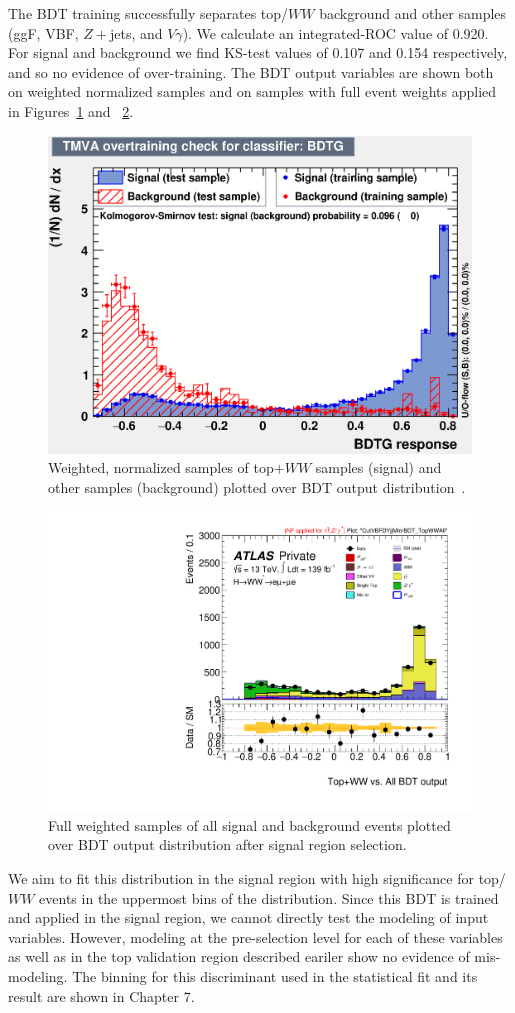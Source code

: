 The BDT training successfully separates top/$WW$ background and other samples (ggF, VBF, $Z+$jets, and $V\gamma$). We calculate an integrated-ROC value of 0.920. For signal and background we find KS-test values of 0.107 and 0.154 respectively, and so no evidence of over-training. The BDT output variables are shown both on weighted normalized samples and on samples with full event weights applied in Figures~\ref{fig:TopBDTresult} and ~\ref{fig:TopBDTresult2}.

\begin{figure}[!htbp]
\centering
  \includegraphics[width=.45\linewidth]{Pictures/Top+WWvsEverything/overtrain_BDTG.eps}
\caption{Weighted, normalized samples of top$+WW$ samples (signal) and other samples (background) plotted over BDT output distribution~\cite{ourSupportNote}.}
\label{fig:TopBDTresult}
\end{figure}

\begin{figure}[!htbp]
\centering
  \includegraphics[width=.45\linewidth]{Pictures/run2-emme-CutVBFDYjjMin-BDT_TopWWAll-lin.pdf}
\caption{Full weighted samples of all signal and background events plotted over BDT output distribution after signal region selection.}
\label{fig:TopBDTresult2}
\end{figure}

We aim to fit this distribution in the signal region with high significance for top/$WW$ events in the uppermost bins of the distribution. Since this BDT is trained and applied in the signal region, we cannot directly test the modeling of input variables. However, modeling at the pre-selection level for each of these variables as well as in the top validation region described eariler show no evidence of mis-modeling. The binning for this discriminant used in the statistical fit and its result are shown in Chapter 7.

